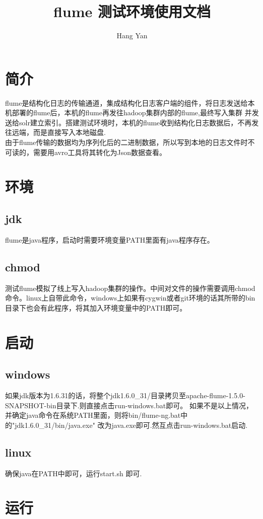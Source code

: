 \documentclass{article}
\title{flume 测试环境使用文档}
\author{Hang Yan}
\begin{document}
\maketitle
\newpage
\section{简介}
flume是结构化日志的传输通道，集成结构化日志客户端的组件，将日志发送给本机部署的flume后，本机的flume再发往hadoop集群内部的flume,最终写入集群
并发送给solr建立索引。搭建测试环境时，本机的flume收到结构化日志数据后，不再发往远端，而是直接写入本地磁盘. \\
由于flume传输的数据均为序列化后的二进制数据，所以写到本地的日志文件时不可读的，需要用avro工具将其转化为Json数据查看。
\section{环境}
\subsection{jdk}
flume是java程序，启动时需要环境变量PATH里面有java程序存在。
\subsection{chmod}
测试flume模拟了线上写入hadoop集群的操作。中间对文件的操作需要调用chmod命令。linux上自带此命令，windows上如果有cygwin或者git环境的话其所带的bin
目录下也会有此程序，将其加入环境变量中的PATH即可。

\section{启动}
\subsection{windows}
如果jdk版本为1.6.31的话，将整个jdk1.6.0\_31/目录拷贝至apache-flume-1.5.0-SNAPSHOT-bin目录下.则直接点击run-windows.bat即可。
如果不是以上情况，并确定java命令在系统PATH里面，则将bin/flume-ng.bat中的"jdk1.6.0\_31/bin/java.exe" 改为java.exe即可.然互点击run-windows.bat启动.

\subsection{linux}
确保java在PATH中即可，运行start.sh 即可.

\section{运行}
\end{document}
